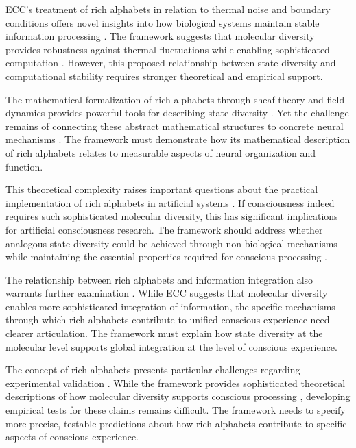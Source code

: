 ECC's treatment of rich alphabets in relation to thermal noise and boundary conditions offers novel insights into how biological systems maintain stable information processing \cite{rosen2012anticipatory}. The framework suggests that molecular diversity provides robustness against thermal fluctuations while enabling sophisticated computation \cite{thompson2014waking}. However, this proposed relationship between state diversity and computational stability requires stronger theoretical and empirical support.

The mathematical formalization of rich alphabets through sheaf theory and field dynamics provides powerful tools for describing state diversity \cite{langer2009philosophy}. Yet the challenge remains of connecting these abstract mathematical structures to concrete neural mechanisms \cite{varela2016embodied}. The framework must demonstrate how its mathematical description of rich alphabets relates to measurable aspects of neural organization and function.

This theoretical complexity raises important questions about the practical implementation of rich alphabets in artificial systems \cite{feinberg2016ancient}. If consciousness indeed requires such sophisticated molecular diversity, this has significant implications for artificial consciousness research. The framework should address whether analogous state diversity could be achieved through non-biological mechanisms while maintaining the essential properties required for conscious processing \cite{zahavi2014self}.

The relationship between rich alphabets and information integration also warrants further examination \cite{merleau2012phenomenology}. While ECC suggests that molecular diversity enables more sophisticated integration of information, the specific mechanisms through which rich alphabets contribute to unified conscious experience need clearer articulation. The framework must explain how state diversity at the molecular level supports global integration at the level of conscious experience.

The concept of rich alphabets presents particular challenges regarding experimental validation \cite{pigliucci2013philosophy}. While the framework provides sophisticated theoretical descriptions of how molecular diversity supports conscious processing \cite{block2009comparing}, developing empirical tests for these claims remains difficult. The framework needs to specify more precise, testable predictions about how rich alphabets contribute to specific aspects of conscious experience.

